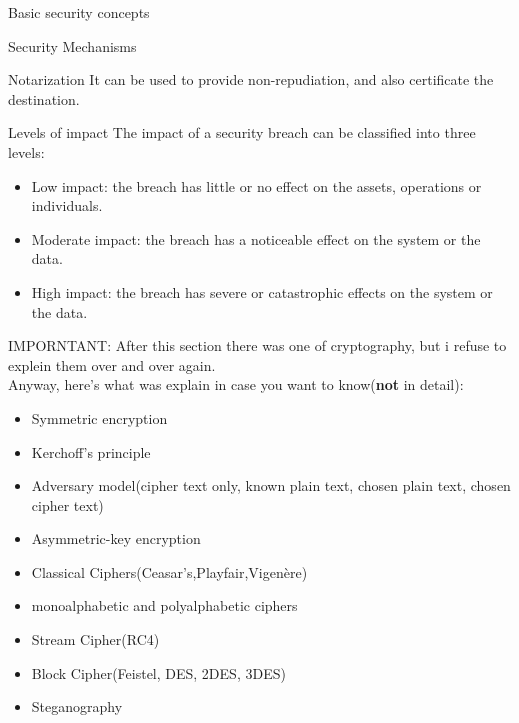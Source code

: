 \begin{section}{Basic security concepts}
\begin{subsection}{Security Mechanisms}
  \begin{paragraph}{Notarization}
    It can be used to provide non-repudiation, and also certificate the destination.
  \end{paragraph}
\end{subsection}
\begin{subsection}{Levels of impact}
  The impact of a security breach can be classified into three levels:
  \begin{itemize}
    \item Low impact: the breach has little or no effect on the assets, operations or individuals.
    \item Moderate impact: the breach has a noticeable effect on the system or the data.
    \item High impact: the breach has severe or catastrophic effects on the system or the data.
  \end{itemize}
\end{subsection}
\begin{boxH}
  IMPORNTANT: After this section there was one of cryptography, but i refuse to explein them over and 
  over again.\\
  Anyway, here's what was explain in case you want to know(\textbf{not} in detail):
  \begin{itemize}
    \item Symmetric encryption
    \item Kerchoff's principle
    \item Adversary model(cipher text only, known plain text, chosen plain text, chosen cipher text)
    \item Asymmetric-key encryption
    \item Classical Ciphers(Ceasar's,Playfair,Vigenère)
    \item monoalphabetic and polyalphabetic ciphers
    \item Stream Cipher(RC4)
    \item Block Cipher(Feistel, DES, 2DES, 3DES)
    \item Steganography
  \end{itemize}
\end{boxH}
\end{section}

